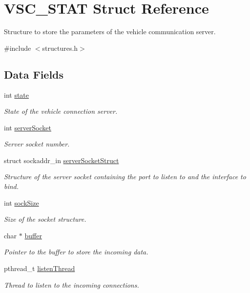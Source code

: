 \hypertarget{struct_v_s_c___s_t_a_t}{}\section{V\+S\+C\+\_\+\+S\+T\+AT Struct Reference}
\label{struct_v_s_c___s_t_a_t}


Structure to store the parameters of the vehicle communication server.  




{\ttfamily \#include $<$structures.\+h$>$}

\subsection*{Data Fields}
\begin{DoxyCompactItemize}
\item 
int \hyperlink{struct_v_s_c___s_t_a_t_a89f234133d3efe315836311cbf21c64b}{state}
\begin{DoxyCompactList}\small\item\em State of the vehicle connection server. \end{DoxyCompactList}\item 
int \hyperlink{struct_v_s_c___s_t_a_t_a106cd1d02a334c78f546d2897a1b939c}{server\+Socket}
\begin{DoxyCompactList}\small\item\em Server socket number. \end{DoxyCompactList}\item 
struct sockaddr\+\_\+in \hyperlink{struct_v_s_c___s_t_a_t_aa6596d8b411e7221fd256518fe443060}{server\+Socket\+Struct}
\begin{DoxyCompactList}\small\item\em Structure of the server socket containing the port to listen to and the interface to bind. \end{DoxyCompactList}\item 
int \hyperlink{struct_v_s_c___s_t_a_t_a67eae050a73c271691a9fb1280b4b358}{sock\+Size}
\begin{DoxyCompactList}\small\item\em Size of the socket structure. \end{DoxyCompactList}\item 
char $\ast$ \hyperlink{struct_v_s_c___s_t_a_t_aff2566f4c366b48d73479bef43ee4d2e}{buffer}
\begin{DoxyCompactList}\small\item\em Pointer to the buffer to store the incoming data. \end{DoxyCompactList}\item 
pthread\+\_\+t \hyperlink{struct_v_s_c___s_t_a_t_a25ed3dd1e477db634fc901c587d710a7}{listen\+Thread}
\begin{DoxyCompactList}\small\item\em Thread to listen to the incoming connections. \end{DoxyCompactList}\end{DoxyCompactItemize}


